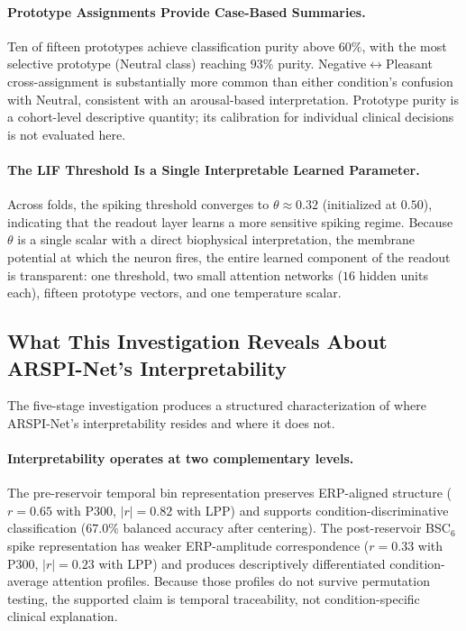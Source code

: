 \paragraph{Prototype Assignments Provide Case-Based Summaries.} Ten of fifteen prototypes achieve classification purity above $60\%$, with the most selective prototype (Neutral class) reaching $93\%$ purity. Negative$\leftrightarrow$Pleasant cross-assignment is substantially more common than either condition's confusion with Neutral, consistent with an arousal-based interpretation. Prototype purity is a cohort-level descriptive quantity; its calibration for individual clinical decisions is not evaluated here.

\paragraph{The LIF Threshold Is a Single Interpretable Learned Parameter.} Across folds, the spiking threshold converges to $\theta \approx 0.32$ (initialized at $0.50$), indicating that the readout layer learns a more sensitive spiking regime. Because $\theta$ is a single scalar with a direct biophysical interpretation, the membrane potential at which the neuron fires, the entire learned component of the readout is transparent: one threshold, two small attention networks ($16$ hidden units each), fifteen prototype vectors, and one temperature scalar.

\subsection{What This Investigation Reveals About ARSPI-Net's Interpretability}
\label{sec:interp_synthesis}

The five-stage investigation produces a structured characterization of where ARSPI-Net's interpretability resides and where it does not.

\paragraph{Interpretability operates at two complementary levels.} The pre-reservoir temporal bin representation preserves ERP-aligned structure ($r = 0.65$ with P300, $|r| = 0.82$ with LPP) and supports condition-discriminative classification ($67.0\%$ balanced accuracy after centering). The post-reservoir BSC$_6$ spike representation has weaker ERP-amplitude correspondence ($r = 0.33$ with P300, $|r| = 0.23$ with LPP) and produces descriptively differentiated condition-average attention profiles. Because those profiles do not survive permutation testing, the supported claim is temporal traceability, not condition-specific clinical explanation.

